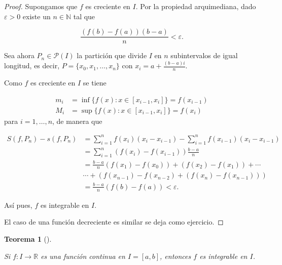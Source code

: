 \documentclass[
  a4paper,
]{scrreport}
\theoremstyle{definition}
\theoremstyle{definition}
\theoremstyle{definition}
\theoremstyle{plain}
\newtheorem{theorem}{Teorema}[chapter]
\theoremstyle{plain}
\theoremstyle{plain}
\theoremstyle{remark}
\begin{document}
\begin{tcolorbox}[enhanced jigsaw, bottomtitle=1mm, title=\textcolor{quarto-callout-note-color}{\faInfo}\hspace{0.5em}{Demostración}, colbacktitle=quarto-callout-note-color!10!white, coltitle=black, leftrule=.75mm, colback=white, toptitle=1mm, toprule=.15mm, titlerule=0mm, opacitybacktitle=0.6, colframe=quarto-callout-note-color-frame, bottomrule=.15mm, arc=.35mm, rightrule=.15mm, breakable, left=2mm, opacityback=0]

\begin{proof}
Supongamos que \(f\) es creciente en \(I\). Por la propiedad
arquimediana, dado \(\varepsilon>0\) existe un \(n\in\mathbb{N}\) tal
que

\[
\frac{(f(b)-f(a))(b-a)}{n} < \varepsilon.
\]

Sea ahora \(P_n\in\mathcal{P}(I)\) la partición que divide \(I\) en
\(n\) subintervalos de igual longitud, es decir,
\(P=\{x_0, x_1, \ldots, x_n\}\) con \(x_i = a+\frac{(b-a)i}{n}\).

Como \(f\) es creciente en \(I\) se tiene

\begin{align*}
m_i &= \inf\{f(x): x\in[x_{i-1},x_i]\} = f(x_{i-1})\\
M_i &= \sup\{f(x): x\in[x_{i-1},x_i]\} = f(x_{i})
\end{align*} para \(i=1,\ldots,n\), de manera que

\begin{align*}
S(f,P_n)-s(f,P_n) 
&= \sum_{i=1}^n f(x_i)(x_i-x_{i-1}) - \sum_{i=1}^n f(x_{i-1})(x_i-x_{i-1}) \\
&= \sum_{i=1}^n (f(x_i)-f(x_{i-1}))\frac{b-a}{n} \\
&= \frac{b-a}{n}(f(x_1)-f(x_0))+(f(x_2)-f(x_1))+ \cdots \\ 
& \cdots + (f(x_{n-1})-f(x_{n-2})+ (f(x_n)-f(x_{n-1}))) \\
&= \frac{b-a}{n}(f(b)-f(a)) < \varepsilon.
\end{align*}

Así pues, \(f\) es integrable en \(I\).

El caso de una función decreciente es similar se deja como ejercicio.
\end{proof}

\end{tcolorbox}

\begin{theorem}[]\protect\hypertarget{thm-integrabilidad-funciones-continuas}{}\label{thm-integrabilidad-funciones-continuas}

Si \(f:I\to\mathbb{R}\) es una función continua en \(I=[a,b]\), entonces
\(f\) es integrable en \(I\).

\end{theorem}
\end{document}
